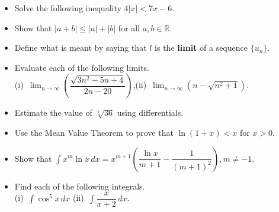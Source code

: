 \documentclass[12pt]{uz-exame}
\begin{document}
 
\rubric{\science}
\makeheading
\sectionAscience
\begin{question}
\begin{itemize}
\item[(a)] Solve the following inequality $4|x|<7x-6$.
\item[(b)] Show that $|a+b|\leq |a|+|b|$ for all $a,b\in \mathbb{R}$.
\end{itemize}
\end{question}
\begin{question}
\begin{itemize}
\item[(a)] Define what is meant by saying that $l$ is the \textbf{limit} of a sequence $\{u_n\}$. 
\item[(b)] Evaluate each of the following limits.\\
(i)\, $\displaystyle \lim _{n\rightarrow \infty}\left(\dfrac{\sqrt{3n^2-5n+4}}{2n-20}\right)$,\quad  \quad (ii)\, $\displaystyle \lim _{n\rightarrow \infty} (n-\sqrt{n^2+1})$.  
\end{itemize}
\end{question}
\begin{question}
\begin{itemize}
\item[(a)] Estimate the value of $\sqrt[5]{36}$ using differentials. 
\item[(b)] Use the Mean Value Theorem to prove that $\ln(1+x)<x$ for $x>0$.
\end{itemize}
\end{question}
\begin{question}
\begin{itemize}
\item[(a)] Show that $\displaystyle\int x^m\ln x\, dx =x^{m+1}\left(\dfrac{\ln x}{m+1}-\dfrac{1}{(m+1)^2}\right), m\neq -1$. 
\item[(b)] Find each of the following integrals.\\
(i)\, $\displaystyle \int \cos ^5 x\, dx$ \quad \quad \quad (ii)\, $\displaystyle \int \dfrac{x}{x+2}\, dx$. 
\end{itemize}
\end{question}
\newpage
\sectionBscience
\end{document}

